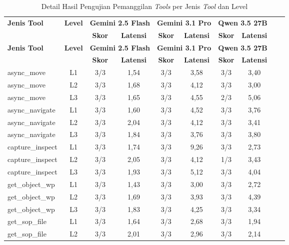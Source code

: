 \begin{longtable}{|l|c|c|c|c|c|c|c|c|c|}
\caption{Detail Hasil Pengujian Pemanggilan \textit{Tools} per Jenis \textit{Tool} dan Level} \label{tab:tools_detail} \\
\hline
\multirow{2}{*}{\textbf{Jenis Tool}} & \multirow{2}{*}{\textbf{Level}} & \multicolumn{2}{c|}{\textbf{Gemini 2.5 Flash}} & \multicolumn{2}{c|}{\textbf{Gemini 3.1 Pro}} & \multicolumn{2}{c|}{\textbf{Qwen 3.5 27B}} \\
\cline{3-8}
& & \textbf{Skor} & \textbf{Latensi} & \textbf{Skor} & \textbf{Latensi} & \textbf{Skor} & \textbf{Latensi} \\
\hline
\endfirsthead
\hline
\multirow{2}{*}{\textbf{Jenis Tool}} & \multirow{2}{*}{\textbf{Level}} & \multicolumn{2}{c|}{\textbf{Gemini 2.5 Flash}} & \multicolumn{2}{c|}{\textbf{Gemini 3.1 Pro}} & \multicolumn{2}{c|}{\textbf{Qwen 3.5 27B}} \\
\cline{3-8}
& & \textbf{Skor} & \textbf{Latensi} & \textbf{Skor} & \textbf{Latensi} & \textbf{Skor} & \textbf{Latensi} \\
\hline
\endhead
async\_move & L1 & 3/3 & 1,54 & 3/3 & 3,58 & 3/3 & 3,40 \\
\hline
async\_move & L2 & 3/3 & 1,68 & 3/3 & 4,12 & 3/3 & 3,00 \\
\hline
async\_move & L3 & 3/3 & 1,65 & 3/3 & 4,55 & 2/3 & 5,06 \\
\hline
async\_navigate & L1 & 3/3 & 1,60 & 3/3 & 4,52 & 3/3 & 3,76 \\
\hline
async\_navigate & L2 & 3/3 & 2,04 & 3/3 & 4,12 & 3/3 & 3,41 \\
\hline
async\_navigate & L3 & 3/3 & 1,84 & 3/3 & 3,76 & 3/3 & 3,80 \\
\hline
capture\_inspect & L1 & 3/3 & 1,74 & 3/3 & 9,26 & 3/3 & 2,73 \\
\hline
capture\_inspect & L2 & 3/3 & 2,05 & 3/3 & 4,12 & 1/3 & 3,43 \\
\hline
capture\_inspect & L3 & 3/3 & 1,93 & 3/3 & 5,12 & 3/3 & 4,04 \\
\hline
get\_object\_wp & L1 & 3/3 & 1,43 & 3/3 & 3,00 & 3/3 & 2,72 \\
\hline
get\_object\_wp & L2 & 3/3 & 1,69 & 3/3 & 3,93 & 3/3 & 4,39 \\
\hline
get\_object\_wp & L3 & 3/3 & 1,83 & 3/3 & 4,25 & 3/3 & 3,34 \\
\hline
get\_sop\_file & L1 & 3/3 & 1,64 & 3/3 & 2,68 & 3/3 & 1,94 \\
\hline
get\_sop\_file & L2 & 3/3 & 2,01 & 3/3 & 2,96 & 3/3 & 2,14 \\

\end{longtable}

